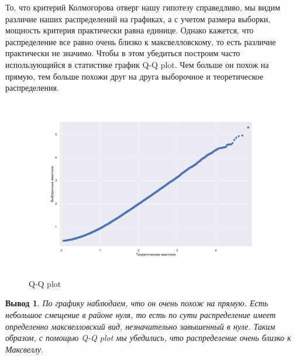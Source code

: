 \documentclass[twoside,twocolumn, 11pt]{article}
\theoremstyle{plain}
\newtheorem{conclusion}{Вывод}
\theoremstyle{definition}
\begin{document}
\indent То, что критерий Колмогорова отверг нашу гипотезу справедливо, мы видим различие наших распределений на графиках, а с учетом размера выборки, мощность критерия практически равна единице.
Однако кажется, что распределение все равно очень близко к максвелловскому, то есть различие практически не значимо. Чтобы в этом убедиться построим часто использующийся в статистике график Q-Q plot. Чем больше он похож на прямую, тем больше похожи друг на друга выборочное и теоретическое распределения.
\begin{figure}[!h]
{\includegraphics[width=1\linewidth]{qqplot}}
\caption{Q-Q plot}
\end{figure}


\begin{conclusion}
По графику наблюдаем, что он очень похож на прямую. Есть небольшое смещение в районе нуля, то есть по сути распределение имеет определенно максвелловский вид, незначительно завышенный в нуле.
Таким образом, с помощью Q-Q plot мы убедились, что распределение очень близко к Максвеллу.
\end{conclusion}
\end{document}
